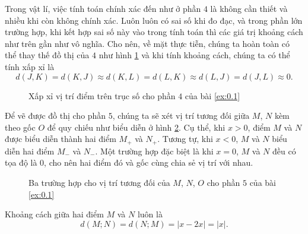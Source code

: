 Trong vật lí, việc tính toán chính xác đến như ở phần $4$ là không cần thiết và nhiều khi còn không chính xác. Luôn luôn có sai số khi đo đạc, và trong phần lớn trường hợp, khi kết hợp sai số này vào trong tính toán thì các giá trị khoảng cách như trên gần như vô nghĩa. Cho nên, về mặt thực tiễn, chúng ta hoàn toàn có thể thay thế đồ thị của $4$ như hình \ref{fig:do_thi:truc_so:truc_so_bon_xx} và khi tính khoảng cách, chúng ta có thể tính xấp xỉ là $$d(J,K) = d(K,J) \approx d(K,L) = d(L,K) \approx d(L,J) = d(J,L) \approx 0.$$

\begin{figure}[H]
   \centering
   \caption{Xấp xỉ vị trí điểm trên trục số cho phần $4$ của bài \ref{ex:0.1}}
   \label{fig:do_thi:truc_so:truc_so_bon_xx}
\end{figure}

Để vẽ được đồ thị cho phần $5$, chúng ta sẽ xét vị trí tương đối giữa $M$, $N$ kèm theo gốc $O$ để quy chiếu như biểu diễn ở hình \ref{fig:truc phan 5}. Cụ thể, khi $x>0$, điểm $M$ và $N$ được biểu diễn thành hai điểm $M_+$ và $N_+$. Tương tự, khi $x<0$, $M$ và $N$ biểu diễn hai điểm $M_-$ và $N_-$. Một trường hợp đặc biệt là khi $x=0$, $M$ và $N$ đều có tọa độ là $0$, cho nên hai điểm đó và gốc cùng chia sẻ vị trí với nhau.

\begin{figure}[H]
   \centering
   \caption{Ba trường hợp cho vị trí tương đối của $M$, $N$, $O$ cho phần $5$ của bài \ref{ex:0.1}}
   \label{fig:truc phan 5}
\end{figure}

Khoảng cách giữa hai điểm $M$ và $N$ luôn là $$d(M;N)=d(N;M)=|x-2x|=|x|.$$